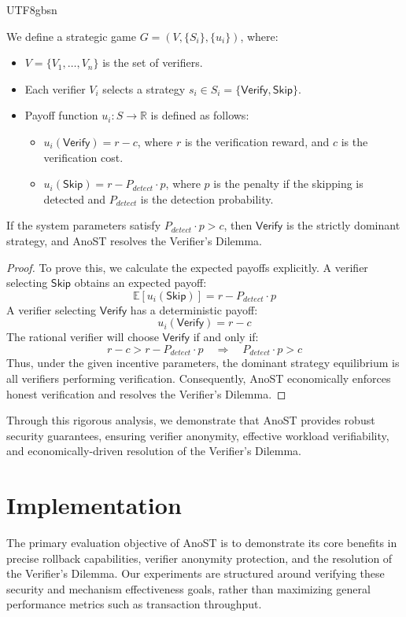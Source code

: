 \documentclass[runningheads]{llncs}
\begin{document}
\begin{CJK*}{UTF8}{gbsn}
\begin{definition}
We define a strategic game $G = (V, \{S_i\}, \{u_i\})$, where:
\begin{itemize}
    \item $V = \{V_1,\dots,V_n\}$ is the set of verifiers.
    \item Each verifier $V_i$ selects a strategy $s_i \in S_i = \{\textsf{Verify}, \textsf{Skip}\}$.
    \item Payoff function $u_i: S \to \mathbb{R}$ is defined as follows:
    \begin{itemize}
        \item $u_i(\textsf{Verify}) = r - c$, where $r$ is the verification reward, and $c$ is the verification cost.
        \item $u_i(\textsf{Skip}) = r - P_{detect}\cdot p$, where $p$ is the penalty if the skipping is detected and $P_{detect}$ is the detection probability.
    \end{itemize}
\end{itemize}
\end{definition}

\begin{theorem}
If the system parameters satisfy $P_{detect}\cdot p > c$, then $\textsf{Verify}$ is the strictly dominant strategy, and AnoST resolves the Verifier's Dilemma.
\end{theorem}

\begin{proof}
To prove this, we calculate the expected payoffs explicitly. A verifier selecting $\textsf{Skip}$ obtains an expected payoff:
\[
\mathbb{E}[u_i(\textsf{Skip})] = r - P_{detect}\cdot p
\]
A verifier selecting $\textsf{Verify}$ has a deterministic payoff:
\[
u_i(\textsf{Verify}) = r - c
\]
The rational verifier will choose $\textsf{Verify}$ if and only if:
\[
r - c > r - P_{detect}\cdot p \quad \Rightarrow \quad P_{detect}\cdot p > c
\]
Thus, under the given incentive parameters, the dominant strategy equilibrium is all verifiers performing verification. Consequently, AnoST economically enforces honest verification and resolves the Verifier's Dilemma.
\end{proof}

Through this rigorous analysis, we demonstrate that AnoST provides robust security guarantees, ensuring verifier anonymity, effective workload verifiability, and economically-driven resolution of the Verifier's Dilemma.


\section{Implementation}
The primary evaluation objective of AnoST is to demonstrate its core benefits in precise rollback capabilities, verifier anonymity protection, and the resolution of the Verifier’s Dilemma. Our experiments are structured around verifying these security and mechanism effectiveness goals, rather than maximizing general performance metrics such as transaction throughput.


\end{CJK*}
\end{document}
